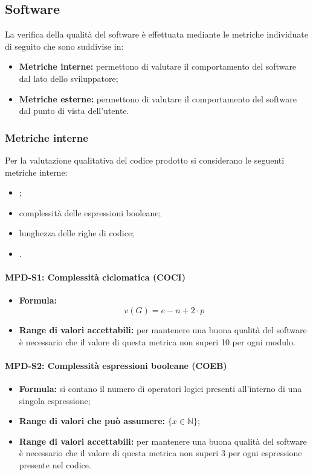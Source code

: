 \subsection{Software} \label{_metricheQualitaCodice}
La verifica della qualità del software è effettuata mediante le metriche individuate di seguito che sono suddivise in:

\begin{itemize}
    \item \textbf{Metriche interne:} permettono di valutare il comportamento del software dal lato dello sviluppatore;
    \item \textbf{Metriche esterne:} permettono di valutare il comportamento del software dal punto di vista dell'utente.
\end{itemize}


\subsubsection{Metriche interne}

Per la valutazione qualitativa del codice prodotto si considerano le seguenti metriche interne:
\begin{itemize}
    \item {};
    \item complessità delle espressioni booleane;
    \item lunghezza delle righe di codice;
    \item {}.
\end{itemize}

\paragraph{MPD-S1: Complessità ciclomatica (COCI)}
\begin{itemize}
    \item \textbf{Formula:} \[ v(G)=e-n+2\cdot p \]
    \item \textbf{Range di valori accettabili:} per mantenere una buona qualità del software è necessario che il valore di questa metrica non superi
    10 per ogni modulo.
\end{itemize}

\paragraph{MPD-S2: Complessità espressioni booleane (COEB)}
\begin{itemize}
    \item \textbf{Formula:} si contano il numero di operatori logici presenti all'interno di una singola espressione;
    \item \textbf{Range di valori che può assumere:} $\{x \in \mathbb{N} \}$;
    \item \textbf{Range di valori accettabili:} per mantenere una buona qualità del software è necessario che il valore di questa metrica non superi
    3 per ogni espressione presente nel codice.
\end{itemize}

